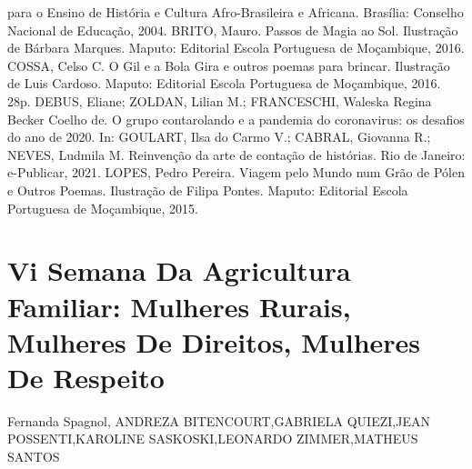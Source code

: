 para o Ensino de História e Cultura Afro-Brasileira e Africana. Brasília: Conselho Nacional 
de Educação, 2004.
BRITO, Mauro. Passos de Magia ao Sol. Ilustração de Bárbara Marques. Maputo: Editorial 
Escola Portuguesa de Moçambique, 2016. 
COSSA, Celso C. O Gil e a Bola Gira e outros poemas para brincar. Ilustração de Luis Cardoso. 
Maputo: Editorial Escola Portuguesa de Moçambique, 2016. 28p. 
DEBUS, Eliane; ZOLDAN, Lilian M.; FRANCESCHI, Waleska Regina Becker Coelho de. O 
grupo contarolando e a pandemia do coronavirus: os desafios do ano de 2020. In: GOULART, Ilsa 
do Carmo V.; CABRAL, Giovanna R.; NEVES, Ludmila M. Reinvenção da arte de contação de 
histórias. Rio de Janeiro: e-Publicar, 2021. 
LOPES, Pedro Pereira. Viagem pelo Mundo num Grão de Pólen e Outros Poemas. Ilustração 
de Filipa Pontes. Maputo: Editorial Escola Portuguesa de Moçambique, 2015.




\section*{Vi Semana Da Agricultura Familiar: Mulheres Rurais, Mulheres De Direitos, Mulheres De Respeito}

Fernanda Spagnol, ANDREZA BITENCOURT,GABRIELA QUIEZI,JEAN POSSENTI,KAROLINE SASKOSKI,LEONARDO ZIMMER,MATHEUS SANTOS

